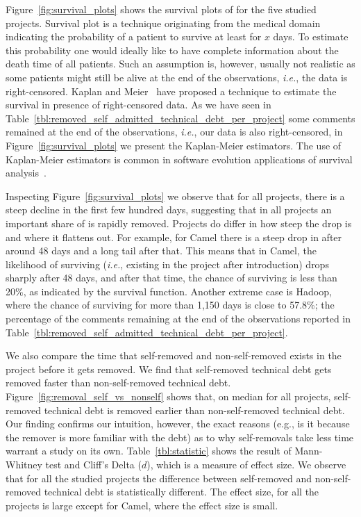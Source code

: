 Figure~\ref{fig:survival_plots} shows the survival plots of \SATD for the five studied projects. Survival plot is a technique originating from the medical domain indicating the probability of a patient to survive at least for $x$ days. To estimate this probability one would ideally like to have complete information about the death time of all patients. Such an assumption is, however, usually not realistic as some patients might still be alive at the end of the observations, \emph{i.e.}, the data is right-censored. Kaplan and Meier~\cite{kaplan1958nonparametric} have proposed a technique to estimate the survival in presence of right-censored data. As we have seen in Table~\ref{tbl:removed_self_admitted_technical_debt_per_project} some \SATD comments remained at the end of the observations, \emph{i.e.}, our data is also right-censored, in Figure~\ref{fig:survival_plots} we present the Kaplan-Meier estimators. The use of Kaplan-Meier estimators is common in software evolution applications of survival analysis~\cite{samoladas2010survival,goeminne2015towards,Lin:et:al}.

Inspecting Figure~\ref{fig:survival_plots} we observe that for all projects, there is a steep decline in the first few hundred days, suggesting that in all projects an important share of \SATD is rapidly removed. Projects do differ in how steep the drop is and where it flattens out. For example, for Camel  there is a steep drop in \SATD after around 48 days and a long tail after that. This means that in Camel, the likelihood of \SATD surviving (\emph{i.e.}, existing in the project after introduction) drops sharply after 48 days, and after that time, the chance of surviving is less than 20\%, as indicated by the survival function. Another extreme case is Hadoop, where the chance of \SATD surviving for more than 1,150 days is close to 57.8\%; the percentage
of the \SATD comments remaining at the end of the observations reported in Table~\ref{tbl:removed_self_admitted_technical_debt_per_project}. 




We also compare the time that self-removed and non-self-removed \SATD exists in the project before it gets removed. We find that self-removed technical debt gets removed faster than non-self-removed technical debt. Figure~\ref{fig:removal_self_vs_nonself} shows that, on median for all projects, self-removed technical debt is removed earlier than non-self-removed technical debt. Our finding confirms our intuition, however, the exact reasons (e.g., is it because the remover is more familiar with the debt) as to why self-removals take less time warrant a study on its own. Table~\ref{tbl:statistic} shows the result of  Mann-Whitney test and Cliff's Delta ($d$), which is a measure of effect size. We observe that for all the studied projects the difference between self-removed and non-self-removed technical debt is statistically different. The effect size, for all the projects is large except for Camel, where the effect size is small.


